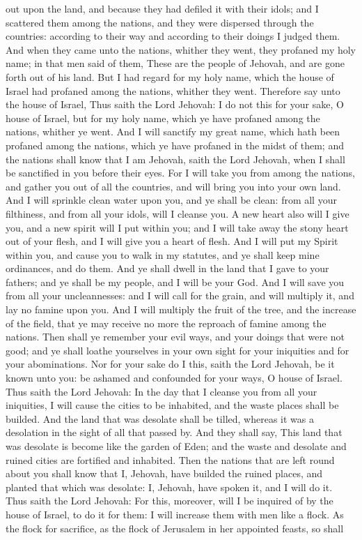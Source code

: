 out upon the land, and because they had defiled it with their idols; and I scattered them among the nations, and they were dispersed through the countries: according to their way and according to their doings I judged them. And when they came unto the nations, whither they went, they profaned my holy name; in that men said of them, These are the people of Jehovah, and are gone forth out of his land. But I had regard for my holy name, which the house of Israel had profaned among the nations, whither they went.  Therefore say unto the house of Israel, Thus saith the Lord Jehovah: I do not this for your sake, O house of Israel, but for my holy name, which ye have profaned among the nations, whither ye went. And I will sanctify my great name, which hath been profaned among the nations, which ye have profaned in the midst of them; and the nations shall know that I am Jehovah, saith the Lord Jehovah, when I shall be sanctified in you before their eyes. For I will take you from among the nations, and gather you out of all the countries, and will bring you into your own land. And I will sprinkle clean water upon you, and ye shall be clean: from all your filthiness, and from all your idols, will I cleanse you. A new heart also will I give you, and a new spirit will I put within you; and I will take away the stony heart out of your flesh, and I will give you a heart of flesh. And I will put my Spirit within you, and cause you to walk in my statutes, and ye shall keep mine ordinances, and do them. And ye shall dwell in the land that I gave to your fathers; and ye shall be my people, and I will be your God. And I will save you from all your uncleannesses: and I will call for the grain, and will multiply it, and lay no famine upon you. And I will multiply the fruit of the tree, and the increase of the field, that ye may receive no more the reproach of famine among the nations. Then shall ye remember your evil ways, and your doings that were not good; and ye shall loathe yourselves in your own sight for your iniquities and for your abominations.  Nor for your sake do I this, saith the Lord Jehovah, be it known unto you: be ashamed and confounded for your ways, O house of Israel. Thus saith the Lord Jehovah: In the day that I cleanse you from all your iniquities, I will cause the cities to be inhabited, and the waste places shall be builded. And the land that was desolate shall be tilled, whereas it was a desolation in the sight of all that passed by. And they shall say, This land that was desolate is become like the garden of Eden; and the waste and desolate and ruined cities are fortified and inhabited. Then the nations that are left round about you shall know that I, Jehovah, have builded the ruined places, and planted that which was desolate: I, Jehovah, have spoken it, and I will do it.  Thus saith the Lord Jehovah: For this, moreover, will I be inquired of by the house of Israel, to do it for them: I will increase them with men like a flock. As the flock for sacrifice, as the flock of Jerusalem in her appointed feasts, so shall 